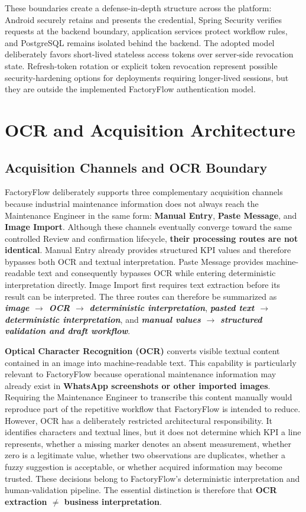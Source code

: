 These boundaries create a defense-in-depth structure across the platform: Android securely retains and presents the credential, Spring Security verifies requests at the backend boundary, application services protect workflow rules, and PostgreSQL remains isolated behind the backend. The adopted model deliberately favors short-lived stateless access tokens over server-side revocation state. Refresh-token rotation or explicit token revocation represent possible security-hardening options for deployments requiring longer-lived sessions, but they are outside the implemented FactoryFlow authentication model.

\section{OCR and Acquisition Architecture}
\subsection{Acquisition Channels and OCR Boundary}
\label{subsec:acquisition-channels-ocr-boundary}

FactoryFlow deliberately supports three complementary acquisition channels because industrial maintenance information does not always reach the Maintenance Engineer in the same form: \textbf{Manual Entry}, \textbf{Paste Message}, and \textbf{Image Import}. Although these channels eventually converge toward the same controlled Review and confirmation lifecycle, \textbf{their processing routes are not identical}. Manual Entry already provides structured KPI values and therefore bypasses both OCR and textual interpretation. Paste Message provides machine-readable text and consequently bypasses OCR while entering deterministic interpretation directly. Image Import first requires text extraction before its result can be interpreted. The three routes can therefore be summarized as \textbf{\textit{image $\rightarrow$ OCR $\rightarrow$ deterministic interpretation}}, \textbf{\textit{pasted text $\rightarrow$ deterministic interpretation}}, and \textbf{\textit{manual values $\rightarrow$ structured validation and draft workflow}}.

\textbf{Optical Character Recognition (OCR)} converts visible textual content contained in an image into machine-readable text. This capability is particularly relevant to FactoryFlow because operational maintenance information may already exist in \textbf{WhatsApp screenshots or other imported images}. Requiring the Maintenance Engineer to transcribe this content manually would reproduce part of the repetitive workflow that FactoryFlow is intended to reduce. However, OCR has a deliberately restricted architectural responsibility. It identifies characters and textual lines, but it does not determine which KPI a line represents, whether a missing marker denotes an absent measurement, whether zero is a legitimate value, whether two observations are duplicates, whether a fuzzy suggestion is acceptable, or whether acquired information may become trusted. These decisions belong to FactoryFlow's deterministic interpretation and human-validation pipeline. The essential distinction is therefore that \textbf{OCR extraction $\neq$ business interpretation}.

